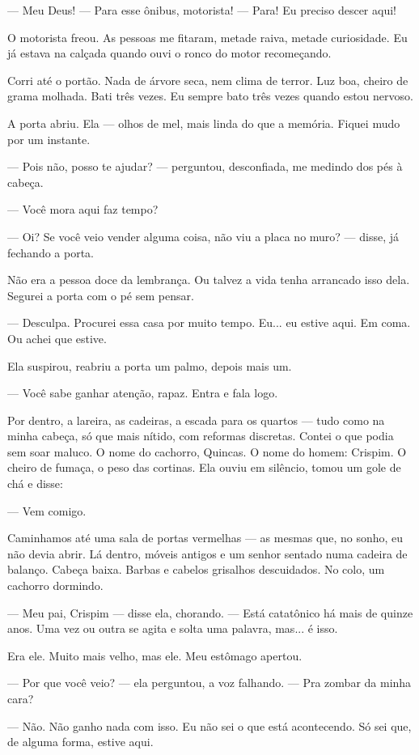 — Meu Deus!
— Para esse ônibus, motorista!
— Para! Eu preciso descer aqui!

O motorista freou. As pessoas me fitaram, metade raiva, metade curiosidade. Eu já estava na calçada quando ouvi o ronco do motor recomeçando.

Corri até o portão. Nada de árvore seca, nem clima de terror. Luz boa, cheiro de grama molhada. Bati três vezes. Eu sempre bato três vezes quando estou nervoso.

A porta abriu. Ela — olhos de mel, mais linda do que a memória. Fiquei mudo por um instante.

— Pois não, posso te ajudar? — perguntou, desconfiada, me medindo dos pés à cabeça.

— Você mora aqui faz tempo?

— Oi? Se você veio vender alguma coisa, não viu a placa no muro? — disse, já fechando a porta.

Não era a pessoa doce da lembrança. Ou talvez a vida tenha arrancado isso dela. Segurei a porta com o pé sem pensar.

— Desculpa. Procurei essa casa por muito tempo. Eu... eu estive aqui. Em coma. Ou achei que estive.

Ela suspirou, reabriu a porta um palmo, depois mais um.

— Você sabe ganhar atenção, rapaz. Entra e fala logo.

Por dentro, a lareira, as cadeiras, a escada para os quartos — tudo como na minha cabeça, só que mais nítido, com reformas discretas. Contei o que podia sem soar maluco. O nome do cachorro, Quincas. O nome do homem: Crispim. O cheiro de fumaça, o peso das cortinas. Ela ouviu em silêncio, tomou um gole de chá e disse:

— Vem comigo.

Caminhamos até uma sala de portas vermelhas — as mesmas que, no sonho, eu não devia abrir. Lá dentro, móveis antigos e um senhor sentado numa cadeira de balanço. Cabeça baixa. Barbas e cabelos grisalhos descuidados. No colo, um cachorro dormindo.

— Meu pai, Crispim — disse ela, chorando. — Está catatônico há mais de quinze anos. Uma vez ou outra se agita e solta uma palavra, mas... é isso.

Era ele. Muito mais velho, mas ele. Meu estômago apertou.

— Por que você veio? — ela perguntou, a voz falhando. — Pra zombar da minha cara?

— Não. Não ganho nada com isso. Eu não sei o que está acontecendo. Só sei que, de alguma forma, estive aqui.

